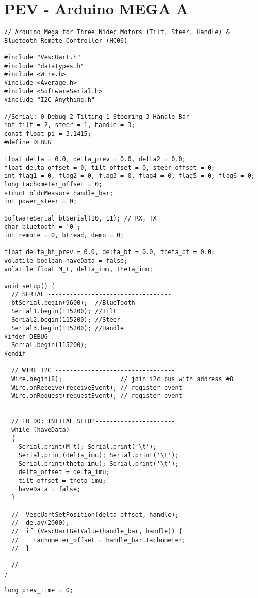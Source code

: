 \newpage
\section{PEV - Arduino MEGA A}
\begin{lstlisting}[style=codearduino]
// Arduino Mega for Three Nidec Motors (Tilt, Steer, Handle) & Bluetooth Remote Controller (HC06)

#include "VescUart.h"
#include "datatypes.h"
#include <Wire.h>
#include <Average.h>
#include <SoftwareSerial.h>
#include "I2C_Anything.h"

//Serial: 0-Debug 2-Tilting 1-Steering 3-Handle Bar
int tilt = 2, steer = 1, handle = 3;
const float pi = 3.1415;
#define DEBUG

float delta = 0.0, delta_prev = 0.0, delta2 = 0.0;
float delta_offset = 0, tilt_offset = 0, steer_offset = 0;
int flag1 = 0, flag2 = 0, flag3 = 0, flag4 = 0, flag5 = 0, flag6 = 0;
long tachometer_offset = 0;
struct bldcMeasure handle_bar;
int power_steer = 0;

SoftwareSerial btSerial(10, 11); // RX, TX
char bluetooth = '0';
int remote = 0, btread, demo = 0;

float delta_bt_prev = 0.0, delta_bt = 0.0, theta_bt = 0.0;
volatile boolean haveData = false;
volatile float M_t, delta_imu, theta_imu;

void setup() {
  // SERIAL ----------------------------------
  btSerial.begin(9600);  //BlueTooth
  Serial1.begin(115200); //Tilt
  Serial2.begin(115200); //Steer
  Serial3.begin(115200); //Handle
#ifdef DEBUG
  Serial.begin(115200);
#endif

  // WIRE I2C ---------------------------------
  Wire.begin(8);                // join i2c bus with address #8
  Wire.onReceive(receiveEvent); // register event
  Wire.onRequest(requestEvent); // register event


  // TO DO: INITIAL SETUP----------------------
  while (haveData)
  {
    Serial.print(M_t); Serial.print('\t');
    Serial.print(delta_imu); Serial.print('\t');
    Serial.print(theta_imu); Serial.print('\t');
    delta_offset = delta_imu;
    tilt_offset = theta_imu;
    haveData = false;
  }

  //  VescUartSetPosition(delta_offset, handle);
  //  delay(2000);
  //  if (VescUartGetValue(handle_bar, handle)) {
  //    tachometer_offset = handle_bar.tachometer;
  //  }

  // ------------------------------------------
}

long prev_time = 0;


\end{lstlisting}
